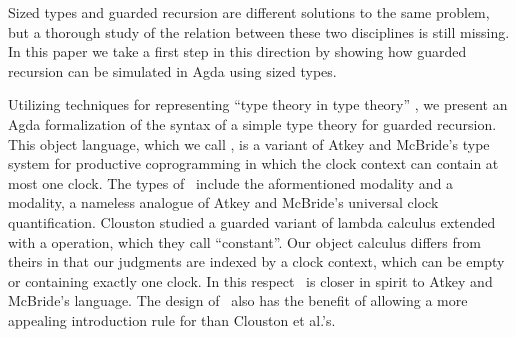 



Sized types and guarded recursion are different solutions to the same
problem, but a thorough study of the relation between these two
disciplines is still missing. In this paper we take a first step in
this direction by showing how guarded recursion can be simulated in
Agda using sized types. 

Utilizing techniques for representing ``type theory in type theory''
\cite{AltenkirchK16,Chapman09}, we present an Agda formalization of
the syntax of a simple type theory for guarded recursion. This object
language, which we call \GTT, is a variant of Atkey and McBride's type
system for productive coprogramming \cite{atkey2013productive} in
which the clock context can contain at most one clock. The types of
\GTT\ include the aformentioned  modality and a  modality,
a nameless analogue of Atkey and McBride's universal clock
quantification. Clouston \etal \cite{CloustonBGB15} studied a
guarded variant of lambda calculus extended with a  operation,
which they call ``constant''.  Our object calculus differs from
theirs in that our judgments are indexed by a clock context, which can
be empty or containing exactly one clock. In this respect \GTT\ is
closer in spirit to Atkey and McBride's language. The design of \GTT\
also has the benefit of allowing a more appealing introduction rule for
\IC{□} than Clouston et al.'s.


